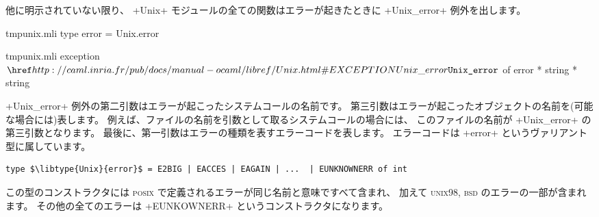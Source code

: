 他に明示されていない限り、
\ml+Unix+ モジュールの全ての関数はエラーが起きたときに \ml+Unix_error+ 例外を出します。
%
\begin{codefile}{tmpunix.mli}
type error = Unix.error
\end{codefile}
%
\begin{listingcodefile}{tmpunix.mli}
exception $\libexn{Unix}{Unix\_error}$ of error * string * string
\end{listingcodefile}
%
\ml+Unix_error+ 例外の第二引数はエラーが起こったシステムコールの名前です。
第三引数はエラーが起こったオブジェクトの名前を(可能な場合には)表します。
例えば、ファイルの名前を引数として取るシステムコールの場合には、
このファイルの名前が \ml+Unix_error+ の第三引数となります。
最後に、第一引数はエラーの種類を表すエラーコードを表します。
エラーコードは \ml+error+ というヴァリアント型に属しています。
%
\begin{lstlisting}
type $\libtype{Unix}{error}$ = E2BIG | EACCES | EAGAIN | ...  | EUNKNOWNERR of int
\end{lstlisting}
%
この型のコンストラクタには \textsc{posix} で定義されるエラーが同じ名前と意味ですべて含まれ、
加えて \textsc{unix98}, \textsc{bsd} のエラーの一部が含まれます。
その他の全てのエラーは \ml+EUNKOWNERR+ というコンストラクタになります。

